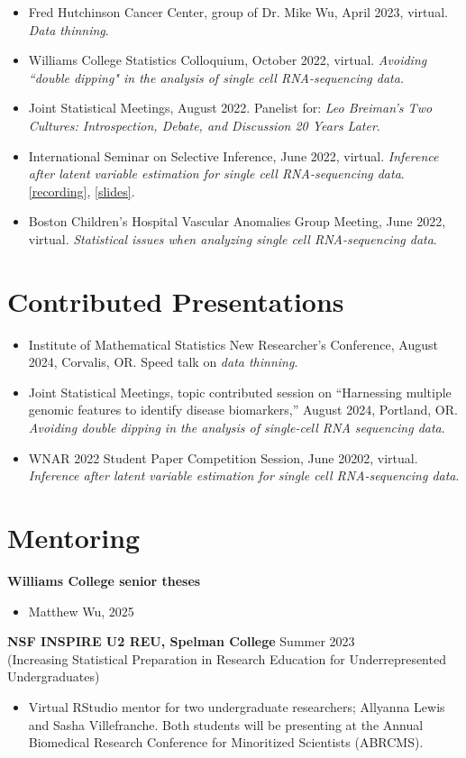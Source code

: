 \documentclass[margin, 10pt]{res}
\begin{document}
\begin{resume}
\begin{itemize}
\item Fred Hutchinson Cancer Center, group of Dr. Mike Wu, April 2023, virtual. \emph{Data thinning}. 
\item Williams College Statistics Colloquium, October 2022, virtual. \emph{Avoiding ``double dipping" in the analysis of single cell RNA-sequencing data.} 
\item Joint Statistical Meetings, August 2022. Panelist for: \emph{Leo Breiman's Two Cultures: Introspection, Debate, and Discussion 20 Years Later}. 
\item International Seminar on Selective Inference, June 2022, virtual. \emph{Inference after latent variable estimation for single cell RNA-sequencing data}. \href{https://drive.google.com/file/d/1U4s7xiuz5yOCeDL2hjfIPZPbD7EsmINb/view}{[recording]}, \href{https://drive.google.com/file/d/1KPX8TkT85jHYalxhieyy65PAj18PRbFF/view}{[slides]}.
\item Boston Children's Hospital Vascular Anomalies Group Meeting, June 2022, virtual. \emph{Statistical issues when analyzing single cell RNA-sequencing data}. 
\end{itemize}
\section{Contributed Presentations} 
\begin{itemize}
\item Institute of Mathematical Statistics New Researcher's Conference, August 2024, Corvalis, OR. Speed talk on \emph{data thinning}.
\item Joint Statistical Meetings, topic contributed session on ``Harnessing multiple genomic features to identify disease biomarkers,” August 2024, Portland, OR.  \emph{Avoiding double dipping in the analysis of single-cell RNA sequencing data}. 
\item WNAR 2022 Student Paper Competition Session, June 20202, virtual. \emph{Inference after latent variable estimation for single cell RNA-sequencing data}.
\end{itemize}

\section{Mentoring}
{\textbf{Williams College senior theses}}
\begin{itemize}
\item Matthew Wu, 2025
\end{itemize}
{\textbf{NSF INSPIRE U2 REU, Spelman College}} \hfill Summer 2023 \\
(Increasing Statistical Preparation in Research Education for Underrepresented Undergraduates)
\begin{itemize}
\item Virtual RStudio mentor for two undergraduate researchers; 
Allyanna Lewis and Sasha Villefranche. Both students will be presenting at the Annual Biomedical Research Conference for Minoritized Scientists (ABRCMS). 
\end{itemize}


\end{resume}
\end{document}
